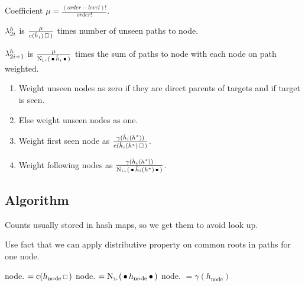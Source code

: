 \begin{draft}
Coefficient $\mu = \frac{(order - level)!}{order!}$.
\end{draft}

\begin{draft}
$\lambda_{2 i}^h$ is $\frac{\mu}{\Count(\DerivedHistory[i]) \Skp)}$ times number
of unseen paths to node.

$\lambda_{2 i + 1}^h$ is
$\frac{\mu}{\ContCountIp(\WSkp \DerivedHistory[i] \WSkp)}$ times the sum of paths to
node with each node on path weighted.
\begin{enumerate}
  \item Weight unseen nodes as zero if they are direct parents of targets and if
    target is seen.
  \item Else weight unseen nodes as one.
  \item Weight first seen node as $\frac{\gamma(\DerivedHistory[i](h^*))}{\Count(\DerivedHistory[i](h^*) \Skp)}$.
  \item Weight following nodes as $\frac{\gamma(\DerivedHistory[i](h^*))}{\ContCountIp(\WSkp \DerivedHistory[i](h^*) \WSkp)}$.
\end{enumerate}
\end{draft}


\subsection{Algorithm}

\begin{draft}
Counts usually stored in hash maps, so we get them to avoid look up.

Use fact that we can apply distributive property on common roots in paths for
one node.
\end{draft}

\begin{algorithmic}[1]
  \State node. $= \Count(h_\text{node} \Skp)$
  \State node. $= \ContCountIp(\WSkp h_\text{node} \WSkp)$
  \State node. $= \gamma(h_\text{node})$
\end{algorithmic}


